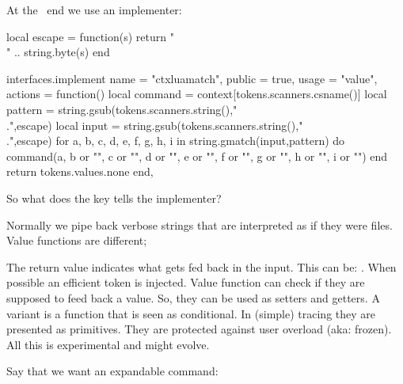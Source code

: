 \stopitemize

\stoptitle

\starttitle[title=A more complex example (\LUA)]

At the \LUA\ end we use an implementer: \blank

\starttyping[style=\small\tt]
local escape = function(s) return "\\" .. string.byte(s) end

interfaces.implement {
    name    = "ctxluamatch",
    public  = true,
    usage   = "value",
    actions = function()
        local command = context[tokens.scanners.csname()]
        local pattern = string.gsub(tokens.scanners.string(),"\\.",escape)
        local input   = string.gsub(tokens.scanners.string(),"\\.",escape)
        for a, b, c, d, e, f, g, h, i in string.gmatch(input,pattern) do
            command(a, b or "", c or "", d or "", e or "", f or "", g or "",
                h or "", i or "")
        end
        return tokens.values.none
    end,
}
\stoptyping

So what does the  key tells the implementer?

\stoptitle

\starttitle[title=Value functions]

Normally we pipe back verbose strings that are interpreted as if they were
files. Value functions are different;

\startitemize

\startitem
    The return value indicates what gets fed back in the input.
\stopitem
\startitem
    This can be: .
\stopitem
\startitem
    When possible an efficient token is injected.
\stopitem
\startitem
    Value function can check if they are supposed to feed back a value.
\stopitem
\startitem
    So, they can be used as setters and getters.
\stopitem
\startitem
    A variant is a function that is seen as conditional.
\stopitem
\startitem
    In (simple) tracing they are presented as primitives.
\stopitem
\startitem
    They are protected against user overload (aka: frozen).
\stopitem
\startitem
    All this is experimental and might evolve.
\stopitem

\stopitemize

\stoptitle

\starttitle[title=So, let's step up a level]

Say that we want an expandable command:

